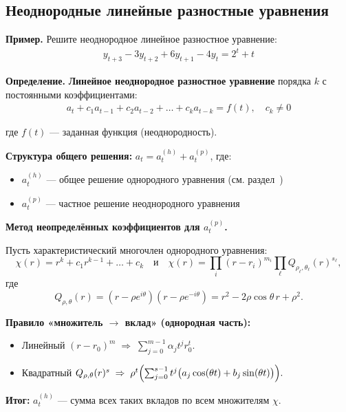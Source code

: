 \subsection{Неоднородные линейные разностные уравнения}\label{sec:inhomogeneous}

\textbf{Пример.} Решите неоднородное линейное разностное уравнение:
\begin{align}
y_{t+3} - 3y_{t+2} + 6y_{t+1} - 4y_t = 2^t + t
\end{align}

\textbf{Определение.} \textbf{Линейное неоднородное разностное уравнение} порядка $k$ с постоянными коэффициентами:
\begin{align}
a_t + c_1 a_{t-1} + c_2 a_{t-2} + \dots + c_k a_{t-k} = f(t), \quad c_k \neq 0
\end{align}

где $f(t)$ — заданная функция (неоднородность).

\textbf{Структура общего решения:} $a_t = a_t^{(h)} + a_t^{(p)}$, где:
\begin{itemize}
\item $a_t^{(h)}$ — общее решение однородного уравнения (см. раздел~)
\item $a_t^{(p)}$ — частное решение неоднородного уравнения
\end{itemize}

\textbf{Метод неопределённых коэффициентов для $a_t^{(p)}$.}

Пусть характеристический многочлен однородного уравнения:
\[
\chi(r) = r^k + c_1 r^{k-1} + \dots + c_k
\quad \text{и} \quad
\chi(r) = \prod_i (r-r_i)^{m_i} \prod_\ell Q_{\rho_\ell, \theta_\ell}(r)^{s_\ell},
\]
где
\[
Q_{\rho,\theta}(r) = (r - \rho e^{i\theta})(r - \rho e^{-i\theta}) = r^2 - 2\rho \cos\theta \, r + \rho^2.
\]

\textbf{Правило «множитель $\to$ вклад» (однородная часть):}

\begin{itemize}
\item Линейный $(r-r_0)^m \;\Rightarrow\; \sum_{j=0}^{m-1} \alpha_j t^j r_0^t.$

\item Квадратный $Q_{\rho,\theta}(r)^s \;\Rightarrow\;
\rho^t \Bigl( \sum_{j=0}^{s-1} t^j \bigl(a_j \cos(\theta t) + b_j \sin(\theta t)\bigr)\Bigr).$
\end{itemize}

\textbf{Итог:} $a_t^{(h)}$ — сумма всех таких вкладов по всем множителям $\chi$.

